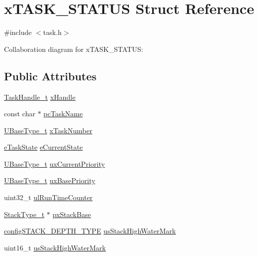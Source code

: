 \hypertarget{structx_t_a_s_k___s_t_a_t_u_s}{}\section{x\+T\+A\+S\+K\+\_\+\+S\+T\+A\+T\+US Struct Reference}
\label{structx_t_a_s_k___s_t_a_t_u_s}


{\ttfamily \#include $<$task.\+h$>$}



Collaboration diagram for x\+T\+A\+S\+K\+\_\+\+S\+T\+A\+T\+US\+:
\subsection*{Public Attributes}
\begin{DoxyCompactItemize}
\item 
\hyperlink{externals_2freertos_2include_2task_8h_a25b35e6e19ecf894173e7ff95edb96ef}{Task\+Handle\+\_\+t} \hyperlink{structx_t_a_s_k___s_t_a_t_u_s_ac57f825f365c3c64bba827285fe3c2a0}{x\+Handle}
\item 
const char $\ast$ \hyperlink{structx_t_a_s_k___s_t_a_t_u_s_a4d3d7d2844278350f50b879ce1a9ea89}{pc\+Task\+Name}
\item 
\hyperlink{externals_2freertos_2portable_2_g_c_c_2_a_r_m___c_m0_2portmacro_8h_a646f89d4298e4f5afd522202b11cb2e6}{U\+Base\+Type\+\_\+t} \hyperlink{structx_t_a_s_k___s_t_a_t_u_s_acd44468ba37270b04f83d0833c098057}{x\+Task\+Number}
\item 
\hyperlink{externals_2freertos_2include_2task_8h_a1749369458e2282a22e862a619a3892c}{e\+Task\+State} \hyperlink{structx_t_a_s_k___s_t_a_t_u_s_a727e904e3afe49472b0fc6a4e96439cb}{e\+Current\+State}
\item 
\hyperlink{externals_2freertos_2portable_2_g_c_c_2_a_r_m___c_m0_2portmacro_8h_a646f89d4298e4f5afd522202b11cb2e6}{U\+Base\+Type\+\_\+t} \hyperlink{structx_t_a_s_k___s_t_a_t_u_s_a39df647234fc0d6de5852042a2741a94}{ux\+Current\+Priority}
\item 
\hyperlink{externals_2freertos_2portable_2_g_c_c_2_a_r_m___c_m0_2portmacro_8h_a646f89d4298e4f5afd522202b11cb2e6}{U\+Base\+Type\+\_\+t} \hyperlink{structx_t_a_s_k___s_t_a_t_u_s_a692f4c8957b7270f1579cdee63ff287e}{ux\+Base\+Priority}
\item 
uint32\+\_\+t \hyperlink{structx_t_a_s_k___s_t_a_t_u_s_a92ab83f4f376c255dedf8e06a78261f7}{ul\+Run\+Time\+Counter}
\item 
\hyperlink{externals_2freertos_2portable_2_g_c_c_2_a_r_m___c_m0_2portmacro_8h_a84e9a8ba132feed0b2401c1f4e2ac63c}{Stack\+Type\+\_\+t} $\ast$ \hyperlink{structx_t_a_s_k___s_t_a_t_u_s_a0ee59674d2cc57d3a5a29c777d5452ed}{px\+Stack\+Base}
\item 
\hyperlink{externals_2freertos_2include_2_free_r_t_o_s_8h_ae4e85bffd36d76cf2796092f0ccd784a}{config\+S\+T\+A\+C\+K\+\_\+\+D\+E\+P\+T\+H\+\_\+\+T\+Y\+PE} \hyperlink{structx_t_a_s_k___s_t_a_t_u_s_a284892acd41bff7c319295687a95af6b}{us\+Stack\+High\+Water\+Mark}
\item 
uint16\+\_\+t \hyperlink{structx_t_a_s_k___s_t_a_t_u_s_a284892acd41bff7c319295687a95af6b}{us\+Stack\+High\+Water\+Mark}
\end{DoxyCompactItemize}


